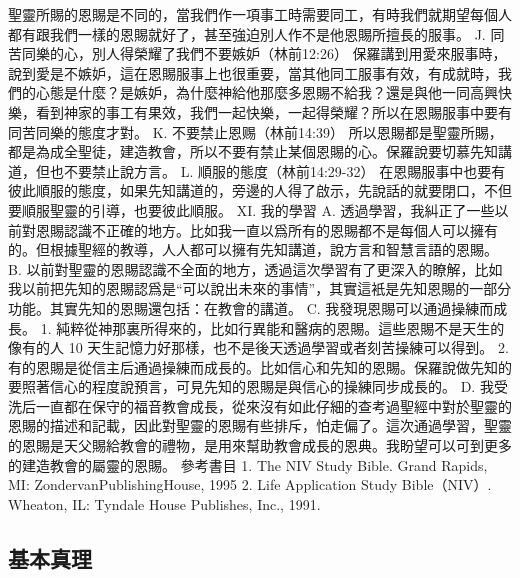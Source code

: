 聖靈所賜的恩賜是不同的，當我們作一項事工時需要同工，有時我們就期望每個人都有跟我們一樣的恩賜就好了，甚至強迫別人作不是他恩賜所擅長的服事。
J. 同苦同樂的心，別人得榮耀了我們不要嫉妒（林前12:26）
保羅講到用愛來服事時，說到愛是不嫉妒，這在恩賜服事上也很重要，當其他同工服事有效，有成就時，我們的心態是什麼？是嫉妒，為什麼神給他那麼多恩賜不給我？還是與他一同高興快樂，看到神家的事工有果效，我們一起快樂，一起得榮耀？所以在恩賜服事中要有同苦同樂的態度才對。
K. 不要禁止恩赐（林前14:39）
所以恩賜都是聖靈所賜，都是為成全聖徒，建造教會，所以不要有禁止某個恩賜的心。保羅說要切慕先知講道，但也不要禁止說方言。
L. 順服的態度（林前14:29-32）
在恩賜服事中也要有彼此順服的態度，如果先知講道的，旁邊的人得了啟示，先說話的就要閉口，不但要順服聖靈的引導，也要彼此順服。
XI. 我的學習
A. 透過學習，我糾正了一些以前對恩賜認識不正確的地方。比如我一直以爲所有的恩賜都不是每個人可以擁有的。但根據聖經的教導，人人都可以擁有先知講道，說方言和智慧言語的恩賜。
B. 以前對聖靈的恩賜認識不全面的地方，透過這次學習有了更深入的瞭解，比如我以前把先知的恩賜認爲是“可以說出未來的事情”，其實這衹是先知恩賜的一部分功能。其實先知的恩賜還包括：在教會的講道。
C. 我發現恩賜可以通過操練而成長。
1. 純粹從神那裏所得來的，比如行異能和醫病的恩賜。這些恩賜不是天生的像有的人
10
天生記憶力好那樣，也不是後天透過學習或者刻苦操練可以得到。
2. 有的恩賜是從信主后通過操練而成長的。比如信心和先知的恩賜。保羅說做先知的要照著信心的程度說預言，可見先知的恩賜是與信心的操練同步成長的。
D. 我受洗后一直都在保守的福音教會成長，從來沒有如此仔細的查考過聖經中對於聖靈的恩賜的描述和記載，因此對聖靈的恩賜有些排斥，怕走偏了。這次通過學習，聖靈的恩賜是天父賜給教會的禮物，是用來幫助教會成長的恩典。我盼望可以可到更多的建造教會的屬靈的恩賜。
參考書目
1. The NIV Study Bible. Grand Rapids, MI: ZondervanPublishingHouse, 1995
2. Life Application Study Bible（NIV）. Wheaton, IL: Tyndale House Publishes, Inc., 1991.

\subsection{基本真理}



